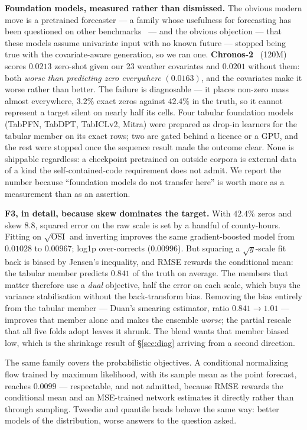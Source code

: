 \documentclass[10pt,letterpaper,twocolumn]{article}
\begin{document}
\textbf{Foundation models, measured rather than dismissed.} The obvious modern
move is a pretrained forecaster --- a family whose usefulness for forecasting
has been questioned on other benchmarks~\cite{tan} --- and the obvious objection --- that these models
assume univariate input with no known future --- stopped being true with the
covariate-aware generation, so we ran one. \textbf{Chronos-2}~\cite{chronos2} (120M) scores
$0.0213$ zero-shot given our 23 weather covariates and $0.0201$ without them:
both \emph{worse than predicting zero everywhere} $(0.0163)$, and the covariates
make it worse rather than better. The failure is diagnosable --- it places
non-zero mass almost everywhere, $3.2\%$ exact zeros against $42.4\%$ in the
truth, so it cannot represent a target silent on nearly half its cells. Four
tabular foundation models (TabPFN, TabDPT, TabICLv2, Mitra) were prepared as
drop-in learners for the tabular member on its exact rows; two are gated behind
a licence or a GPU, and the rest were stopped once the sequence result made the
outcome clear. None is shippable regardless: a checkpoint pretrained on outside
corpora is external data of a kind the self-contained-code requirement does not
admit. We report the number because ``foundation models do not transfer here''
is worth more as a measurement than as an assertion.

\textbf{F3, in detail, because skew dominates the target.} With $42.4\%$ zeros
and skew $8.8$, squared error on the raw scale is set by a handful of
county-hours. Fitting on $\sqrt{\mathrm{OSI}}$ and inverting improves the same
gradient-boosted model from $0.01028$ to $0.00967$; log1p over-corrects
($0.00996$). But squaring a $\sqrt{y}$-scale fit back is biased by Jensen's
inequality, and RMSE rewards the conditional mean: the tabular member predicts
$0.841$ of the truth on average. The members that matter therefore use a
\emph{dual} objective, half the error on each scale, which buys the variance
stabilisation without the back-transform bias. Removing the bias entirely from
the tabular member --- Duan's smearing estimator, ratio $0.841 \to 1.01$ ---
improves that member alone and makes the ensemble \emph{worse}; the partial
rescale that all five folds adopt leaves it shrunk. The blend wants that member
biased low, which is the shrinkage result of §\ref{sec:diag} arriving from a
second direction.

The same family covers the probabilistic objectives. A conditional normalizing
flow trained by maximum likelihood, with its sample mean as the point forecast,
reaches $0.0099$ --- respectable, and not admitted, because RMSE rewards the
conditional mean and an MSE-trained network estimates it directly rather than
through sampling. Tweedie and quantile heads behave the same way: better models
of the distribution, worse answers to the question asked.
\end{document}
